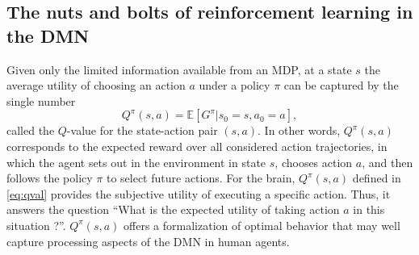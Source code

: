 \documentclass[10pt,letterpaper]{article}
\def\V{\mathbf{V}}
\begin{document}
\subsection{The nuts and bolts of reinforcement learning in the DMN}
Given only the limited information available from an MDP, at a state $s$ the average
utility of choosing an action $a$ under a policy $\pi$ can be captured by the single number
\begin{equation}
  \label{eq:qval}
  Q^{\pi}(s,a) = \mathbb E [G^\pi|s_0=s,a_0=a],
\end{equation}
called the $Q$-value for the state-action pair $(s,a)$.
In other words, $Q^{\pi}(s,a)$ corresponds to the expected reward
over all considered action trajectories, in which
the agent sets out in the environment in state
$s$, chooses action $a$, and then follows the policy $\pi$ to select future actions.
For the brain,
$Q^{\pi}(s, a)$ defined in \eqref{eq:qval} provides the subjective
utility of executing a specific action.
Thus, it answers the question
``What is the expected utility of taking action $a$ in this situation ?''.
$Q^{\pi}(s,a)$ offers a formalization of optimal behavior that
may well capture processing aspects of the DMN in human agents.



\end{document}
